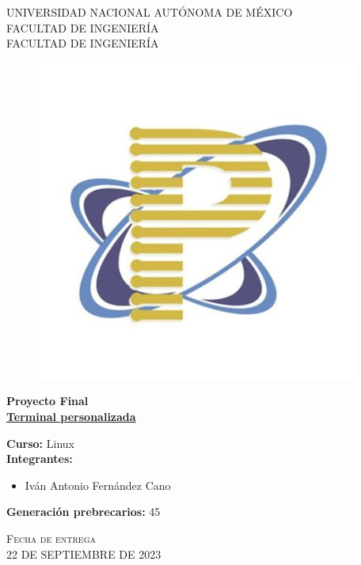 \documentclass[letter,11pt]{article}
\begin{document}
\thispagestyle{empty} 

\begin{center} \LARGE{UNIVERSIDAD NACIONAL AUTÓNOMA DE MÉXICO} \\[0.5cm] \Large{FACULTAD DE INGENIERÍA}\\[0.40cm] \large{ FACULTAD DE INGENIERÍA} \end{center}
\begin{figure}[htb] 
    \centering 
    \includegraphics[scale=.6]{protecologo.jpg} 
\end{figure}
\begin{center} \large{\bf Proyecto Final}\\ \vspace{.25cm} { \Large \bfseries \underline{Terminal personalizada}} \\ \end{center}
\large{\bf Curso: } Linux\\
\large{\bf Integrantes: }
    \begin{itemize}
        \item Iván Antonio Fernández Cano
    \end{itemize}
\large{\bf Generación prebrecarios:} 45\\
\begin{center} 
    \Large \textsc{Fecha de entrega} \\
    \Large \textsc{22 DE SEPTIEMBRE DE 2023} 
\end{center}

\tableofcontents
\setcounter{tocdepth}{4}
\end{document}
